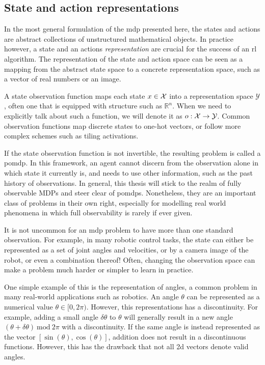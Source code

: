 \subsection{State and action representations}

In the most general formulation of the \ac{mdp} presented here, the states and actions are abstract collections of unstructured mathematical objects.
In practice however, a state and an actions \emph{representation} are crucial for the success of an \ac{rl} algorithm.
The representation of the state and action space can be seen as a mapping from the abstract state space to a concrete representation space, such as a vector of real numbers or an image.

A state observation function maps each state $x\in\mathcal{X}$ into a representation space $\mathcal{Y}$, often one that is equipped with structure such as $\mathbb{R}^n$.
When we need to explicitly talk about such a function, we will denote it as $o: \mathcal{X} \rightarrow \mathcal{Y}$.
Common observation functions map discrete states to one-hot vectors, or follow more complex schemes such as tiling activations.

If the state observation function is not invertible, the resulting problem is called a \ac{pomdp}.
In this framework, an agent cannot discern from the observation alone in which state it currently is, and needs to use other information, such as the past history of observations.
In general, this thesis will stick to the realm of fully observable MDPs and steer clear of \acp{pomdp}.
Nonetheless, they are an important class of problems in their own right, especially for modelling real world phenomena in which full observability is rarely if ever given.

It is not uncommon for an \ac{mdp} problem to have more than one standard observation.
For example, in many robotic control tasks, the state can either be represented as a set of joint angles and velocities, or by a camera image of the robot, or even a combination thereof!
Often, changing the observation space can make a problem much harder or simpler to learn in practice.

One simple example of this is the representation of angles, a common problem in many real-world applications such as robotics.
An angle $\theta$ can be represented as a numerical value $\theta \in [0,2\pi)$.
However, this representations has a discontinuity.
For example, adding a small angle $\delta\theta$ to $\theta$ will generally result in a new angle $(\theta + \delta\theta)~\mathrm{mod}~2\pi$ with a discontinuity.
If the same angle is instead represented as the vector $[\sin(\theta),\cos(\theta)]$, addition does not result in a discontinuous functions.
However, this has the drawback that not all 2d vectors denote valid angles.

